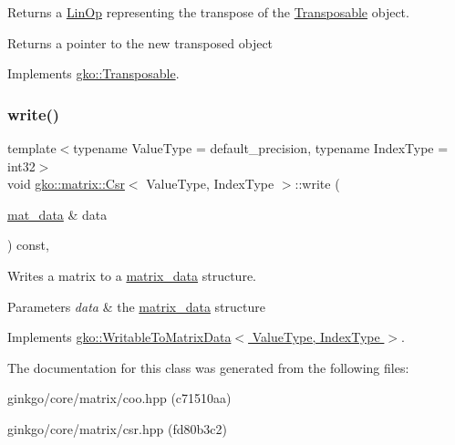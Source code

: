 Returns a \hyperlink{classgko_1_1LinOp}{Lin\+Op} representing the transpose of the \hyperlink{classgko_1_1Transposable}{Transposable} object. 

\begin{DoxyReturn}{Returns}
a pointer to the new transposed object 
\end{DoxyReturn}


Implements \hyperlink{classgko_1_1Transposable_a5c6b778b71b47d53e0bda6ccf894d318}{gko\+::\+Transposable}.

\mbox{\label{classgko_1_1matrix_1_1Csr_a205fc391f4cf4f7718a55b0a61f62bc9}} 
\subsubsection{\texorpdfstring{write()}{write()}}
{\footnotesize\ttfamily template$<$typename Value\+Type = default\+\_\+precision, typename Index\+Type = int32$>$ \\
void \hyperlink{classgko_1_1matrix_1_1Csr}{gko\+::matrix\+::\+Csr}$<$ Value\+Type, Index\+Type $>$\+::write (\begin{DoxyParamCaption}\item[{\hyperlink{structgko_1_1matrix__data}{mat\+\_\+data} \&}]{data }\end{DoxyParamCaption}) const\hspace{0.3cm}{\ttfamily [override]}, {\ttfamily [virtual]}}



Writes a matrix to a \hyperlink{structgko_1_1matrix__data}{matrix\+\_\+data} structure. 


\begin{DoxyParams}{Parameters}
{\em data} & the \hyperlink{structgko_1_1matrix__data}{matrix\+\_\+data} structure \\
\hline
\end{DoxyParams}


Implements \hyperlink{classgko_1_1WritableToMatrixData_a96036c3a4bf4c67fa93002808b8b14e2}{gko\+::\+Writable\+To\+Matrix\+Data$<$ Value\+Type, Index\+Type $>$}.



The documentation for this class was generated from the following files\+:\begin{DoxyCompactItemize}
\item 
ginkgo/core/matrix/coo.\+hpp (c71510aa)\item 
ginkgo/core/matrix/csr.\+hpp (fd80b3c2)\end{DoxyCompactItemize}
